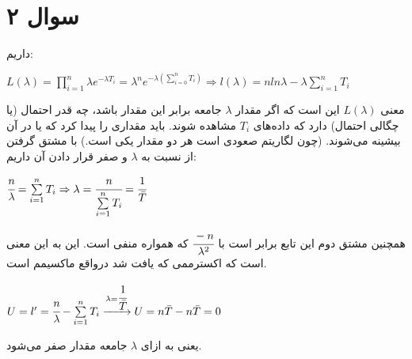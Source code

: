 \documentclass[12pt]{article}
\begin{document}
\section{سوال ۲}
داریم:
\begin{latin}
	$
	L(\lambda) = \prod\limits_{i = 1}^n \lambda e^{-\lambda T_i} = \lambda^n e^{-\lambda (\sum_{i=0}^n T_i)}
	\Rightarrow
	l(\lambda) = n ln \lambda - \lambda \sum\limits_{i = 1}^n T_i
	$
\end{latin}
معنی 
$L(\lambda)$
این است که اگر مقدار 
$\lambda$
جامعه برابر این مقدار باشد، چه قدر احتمال  (یا چگالی احتمال) دارد که داده‌های 
$T_i$
مشاهده شوند.
باید مقداری را پیدا کرد که  
یا 
در آن بیشینه می‌شوند. (چون لگاریتم صعودی است هر دو مقدار یکی است.)
با مشتق گرفتن از 
نسبت به $\lambda$ و صفر قرار دادن آن داریم:
\begin{latin}
	$
	\cfrac{n}{\lambda} = \sum\limits_{i = 1}^n T_i  \Rightarrow \lambda = \cfrac{n}{\sum\limits_{i = 1}^n T_i } = \cfrac{1}{\bar{T}}
	$
\end{latin}
همچنین مشتق دوم این تابع برابر است با 
$\cfrac{-n}{\lambda^2}$
که همواره منفی است. این به این معنی است که اکسترممی که یافت شد درواقع ماکسیمم است.
\begin{latin}
	$
	U = l' = \cfrac{n}{\lambda} - \sum\limits_{i = 1}^n T_i \xrightarrow{\lambda = \cfrac{1}{\bar{T}}} 
	U =  n \bar{T} - n \bar{T} = 0
	$
\end{latin}
یعنی به ازای 
$\lambda$
جامعه مقدار 
صفر می‌شود.
\end{document}

